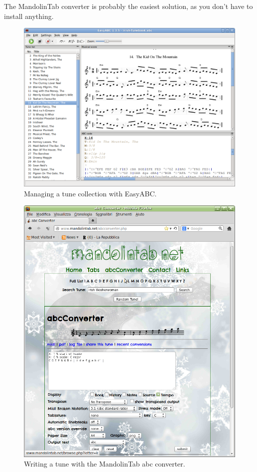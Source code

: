 \documentclass[a4paper,12pt]{book}
\begin{document}
The MandolinTab converter is probably the easiest solution, as you
don't have to install anything.

\begin{figure}[htbp]
\centering
\includegraphics[width=0.9 \linewidth]{screenshot-easyabc.png}
\caption{Managing a tune  collection with EasyABC.}
\label{fig:easyabc}
\end{figure}

\begin{figure}[htbp]
\centering
\includegraphics[width=0.9 \linewidth]{screenshot-mandolintab.png}
\caption{Writing a tune with the MandolinTab abc converter.}
\label{fig:mandolintab}
\end{figure}
\end{document}
